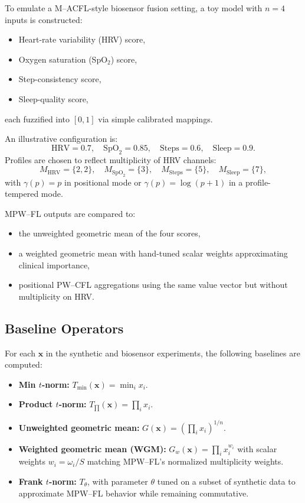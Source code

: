 \documentclass[11pt]{article}
\begin{document}
To emulate a M--ACFL-style biosensor fusion setting, a toy model with $n=4$ inputs is constructed:

\begin{itemize}
  \item Heart-rate variability (HRV) score,
  \item Oxygen saturation (SpO$_2$) score,
  \item Step-consistency score,
  \item Sleep-quality score,
\end{itemize}
each fuzzified into $[0,1]$ via simple calibrated mappings.

An illustrative configuration is:
\[
  \text{HRV} = 0.7, \quad \text{SpO}_2 = 0.85, \quad \text{Steps} = 0.6, \quad \text{Sleep} = 0.9.
\]
Profiles are chosen to reflect multiplicity of HRV channels:
\[
  M_{\mathrm{HRV}} = \{2,2\},\quad
  M_{\mathrm{SpO}_2} = \{3\},\quad
  M_{\mathrm{Steps}} = \{5\},\quad
  M_{\mathrm{Sleep}} = \{7\},
\]
with $\gamma(p) = p$ in positional mode or $\gamma(p) = \log(p+1)$ in a profile-tempered mode.

MPW--FL outputs are compared to:
\begin{itemize}
  \item the unweighted geometric mean of the four scores,
  \item a weighted geometric mean with hand-tuned scalar weights approximating clinical importance,
  \item positional PW--CFL aggregations using the same value vector but without multiplicity on HRV.
\end{itemize}

\subsection{Baseline Operators}
\label{subsec:baselines}

For each $\mathbf{x}$ in the synthetic and biosensor experiments, the following baselines are computed:

\begin{itemize}
  \item \textbf{Min $t$-norm:} $T_{\min}(\mathbf{x}) = \min_i x_i$.
  \item \textbf{Product $t$-norm:} $T_{\prod}(\mathbf{x}) = \prod_i x_i$.
  \item \textbf{Unweighted geometric mean:} $G(\mathbf{x}) = (\prod_i x_i)^{1/n}$.
  \item \textbf{Weighted geometric mean (WGM):} $G_w(\mathbf{x}) = \prod_i x_i^{w_i}$ with scalar weights $w_i = \omega_i / S$ matching MPW--FL’s normalized multiplicity weights.
  \item \textbf{Frank $t$-norm:} $T_\theta$, with parameter $\theta$ tuned on a subset of synthetic data to approximate MPW--FL behavior while remaining commutative.
\end{itemize}
\end{document}
